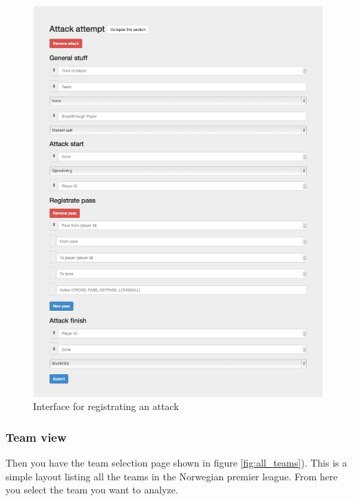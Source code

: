 \begin{figure}[ht!]
\centering
\includegraphics[width=1\textwidth]{images/general/reg_attack.png}
\caption{Interface for registrating an attack}
\label{fig:reg_attack}
\end{figure}

\subsubsection{Team view}

Then you have the team selection page shown in figure \ref{fig:all_teams}). This is a simple layout listing all the teams in the Norwegian premier league. From here you select the team you want to analyze.


